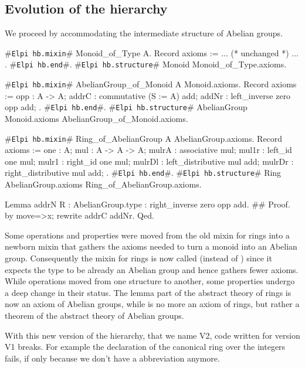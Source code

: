 \documentclass[a4paper,UKenglish,cleveref, autoref]{lipics-v2019}
\newcommand{\mixin}{mixin}
\newcommand{\phantterm}{abbreviation}
\newcommand{\hbmixin}{{\tt\color{dkgreen}Elpi hb.mixin}}
\newcommand{\hbstructure}{{\tt\color{dkgreen}Elpi hb.structure}}
\newcommand{\hbend}{{\tt\color{dkgreen}Elpi hb.end}}
\theoremstyle{implem}
\theoremstyle{implem}
\theoremstyle{command}
\begin{document}
\subsection{Evolution of the hierarchy}\label{subsec:evolution}

We proceed by accommodating the intermediate
structure of Abelian groups.

\begin{coqcode}
#\hbmixin{}# Monoid_of_Type A.
  Record axioms := { ... (* unchanged *) ... }.
#\hbend{}#.
#\hbstructure{}# Monoid Monoid_of_Type.axioms.

#\hbmixin{}# AbelianGroup_of_Monoid A Monoid.axioms.
  Record axioms := {
    opp : A -> A;
    addrC : commutative (S := A) add;
    addNr : left_inverse zero opp add;
  }.
#\hbend{}#.
#\hbstructure{}# AbelianGroup Monoid.axioms AbelianGroup_of_Monoid.axioms.

#\hbmixin{}# Ring_of_AbelianGroup A AbelianGroup.axioms.
  Record axioms := {
    one : A;
    mul : A -> A -> A;
    mulrA : associative mul;
    mul1r : left_id one mul;              mulr1 : right_id one mul;
    mulrDl : left_distributive mul add;   mulrDr : right_distributive mul add;
  }.
#\hbend{}#.
#\hbstructure{}# Ring AbelianGroup.axioms Ring_of_AbelianGroup.axioms.

Lemma addrN {R : AbelianGroup.type} : right_inverse zero opp add.               #\label{demo2:proof:addrN}#
Proof. by move=>x; rewrite addrC addNr. Qed.
\end{coqcode}

Some operations and properties were moved from the old \mixin{} for rings
into a newborn \mixin{}  that gathers the
axioms needed to turn a monoid into an Abelian group. Consequently the \mixin{}
for rings is now called  (instead of )
since it expects the type  to be already an Abelian group and hence
gathers fewer axioms. \\
While operations moved from one structure to another, some properties
undergo a deep change in their status.
The lemma  part of the abstract theory of
rings is now an axiom of Abelian groups, while  is no more
an axiom of rings, but rather a theorem of the abstract theory of Abelian
groups.

With this new version of the hierarchy, that we name V2, code written
for version V1 breaks. For example the declaration of the canonical ring over
the integers fails, if only
because we don't have a  \phantterm{} anymore.
\end{document}
